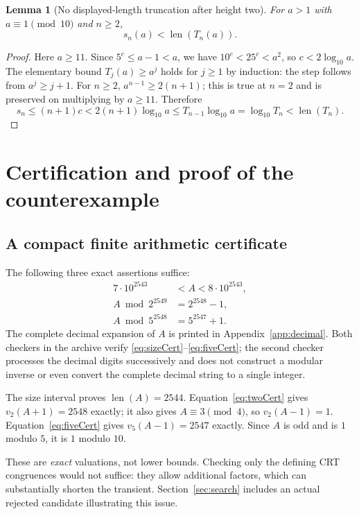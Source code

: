 \documentclass[11pt,a4paper]{article}
\newtheorem{lemma}[theorem]{Lemma}
\theoremstyle{definition}
\theoremstyle{remark}
\newcommand{\len}{\operatorname{len}}
\begin{document}
\begin{lemma}[No displayed-length truncation after height two]\label{lem:displayed}
For $a>1$ with $a\equiv1\pmod{10}$ and $n\ge2$,
\[
 s_n(a)<\len(T_n(a)).
\]
\end{lemma}
\begin{proof}
Here $a\ge11$. Since $5^c\le a-1<a$, we have
$10^c<25^c<a^2$, so $c<2\log_{10}a$.
The elementary bound $T_j(a)\ge a^j$ holds for $j\ge1$ by induction: the step follows from $a^j\ge j+1$.
For $n\ge2$, $a^{n-1}\ge2(n+1)$; this is true at $n=2$ and is preserved on multiplying by $a\ge11$.
Therefore
\[
 s_n\le(n+1)c<2(n+1)\log_{10}a
 \le T_{n-1}\log_{10}a=\log_{10}T_n<\len(T_n).
\]
\end{proof}

\section{Certification and proof of the counterexample}
\label{sec:counterproof}

\subsection{A compact finite arithmetic certificate}
The following three exact assertions suffice:
\begin{align}
 7\cdot10^{2543}&<A<8\cdot10^{2543},\label{eq:sizeCert}\\
 A\bmod2^{2549}&=2^{2548}-1,\label{eq:twoCert}\\
 A\bmod5^{2548}&=5^{2547}+1.\label{eq:fiveCert}
\end{align}
The complete decimal expansion of $A$ is printed in Appendix~\ref{app:decimal}. Both checkers in the archive verify \eqref{eq:sizeCert}--\eqref{eq:fiveCert}; the second checker processes the decimal digits successively and does not construct a modular inverse or even convert the complete decimal string to a single integer.

The size interval proves $\len(A)=2544$. Equation~\eqref{eq:twoCert} gives $v_2(A+1)=2548$ exactly; it also gives $A\equiv3\pmod4$, so $v_2(A-1)=1$. Equation~\eqref{eq:fiveCert} gives $v_5(A-1)=2547$ exactly. Since $A$ is odd and is $1$ modulo $5$, it is $1$ modulo $10$.

These are \emph{exact} valuations, not lower bounds. Checking only the defining CRT congruences would not suffice: they allow additional factors, which can substantially shorten the transient. Section~\ref{sec:search} includes an actual rejected candidate illustrating this issue.
\end{document}
